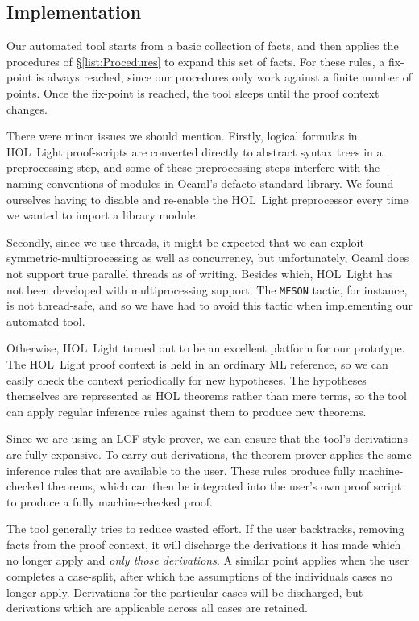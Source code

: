 \subsection{Implementation}\label{sec:DiscoveryImplementation}
Our automated tool starts from a basic collection of facts, and then applies the procedures of \S\ref{list:Procedures} to expand this set of facts. For these rules, a fix-point is always reached, since our procedures only work against a finite number of points. Once the fix-point is reached, the tool sleeps until the proof context changes.

There were minor issues we should mention.  Firstly, logical formulas in HOL~Light proof-scripts are converted directly to abstract syntax trees in a preprocessing step, and some of these preprocessing steps interfere with the naming conventions of modules in Ocaml's defacto standard library. We found ourselves having to disable and re-enable the HOL~Light preprocessor every time we wanted to import a library module.

Secondly, since we use threads, it might be expected that we can exploit symmetric-multiprocessing as well as concurrency, but unfortunately, Ocaml does not support true parallel threads as of writing. Besides which, HOL~Light has not been developed with multiprocessing support. The \texttt{MESON} tactic, for instance, is not thread-safe, and so we have had to avoid this tactic when implementing our automated tool.

Otherwise, HOL~Light turned out to be an excellent platform for our prototype. The HOL~Light proof context is held in an ordinary ML reference, so we can easily check the context periodically for new hypotheses. The hypotheses themselves are represented as HOL theorems rather than mere terms, so the tool can apply regular inference rules against them to produce new theorems.

Since we are using an LCF style prover, we can ensure that the tool's derivations are fully-expansive. To carry out derivations, the theorem prover applies the same inference rules that are available to the user. These rules produce fully machine-checked theorems, which can then be integrated into the user's own proof script to produce a fully machine-checked proof.

The tool generally tries to reduce wasted effort. If the user backtracks, removing facts from the proof context, it will discharge the derivations it has made which no longer apply and \emph{only those derivations}. A similar point applies when the user completes a case-split, after which the assumptions of the individuals cases no longer apply. Derivations for the particular cases will be discharged, but derivations which are applicable across all cases are retained.

